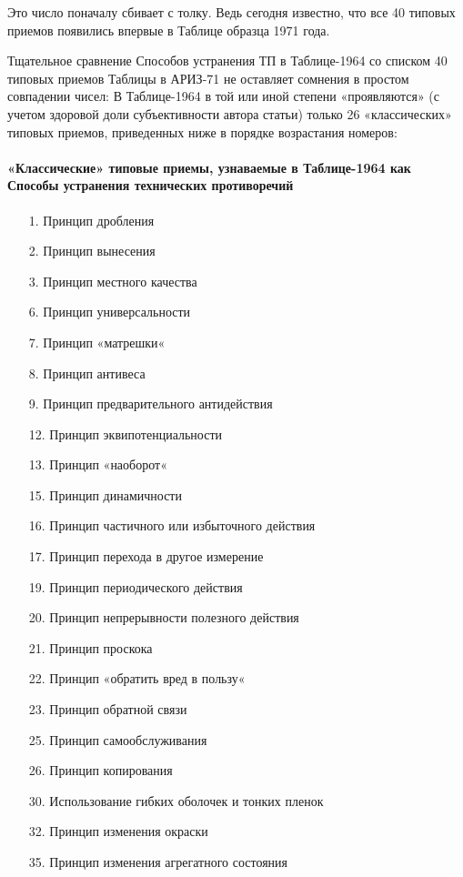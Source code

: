 \documentclass[11pt,a4paper]{article}
\begin{document}
Это число поначалу сбивает с толку. Ведь сегодня известно, что все 40 типовых
приемов появились впервые в Таблице образца 1971 года.

Тщательное сравнение Способов устранения ТП в Таблице-1964 со списком 40
типовых приемов Таблицы в АРИЗ-71 не оставляет сомнения в простом совпадении
чисел: В Таблице-1964 в той или иной степени «проявляются» (с учетом здоровой
доли субъективности автора статьи) только 26 «классических» типовых приемов,
приведенных ниже в порядке возрастания номеров:

\paragraph{«Классические» типовые приемы, узнаваемые в Таблице-1964 как
  Способы устранения технических противоречий}
\begin{itemize}
\item[1.] Принцип дробления
\item[2.] Принцип вынесения
\item[3.] Принцип местного качества
\item[6.] Принцип универсальности
\item[7.] Принцип «матрешки«
\item[8.] Принцип антивеса
\item[9.] Принцип предварительного антидействия
\item[12.] Принцип эквипотенциальности
\item[13.] Принцип «наоборот«
\item[15.] Принцип динамичности
\item[16.] Принцип частичного или избыточного действия
\item[17.] Принцип перехода в другое измерение
\item[19.] Принцип периодического действия
\item[20.] Принцип непрерывности полезного действия
\item[21.] Принцип проскока
\item[22.] Принцип «обратить вред в пользу«
\item[23.] Принцип обратной связи
\item[25.] Принцип самообслуживания
\item[26.] Принцип копирования
\item[30.] Использование гибких оболочек и тонких пленок
\item[32.] Принцип изменения окраски
\item[35.] Принцип изменения агрегатного состояния
\end{itemize}
\end{document}
